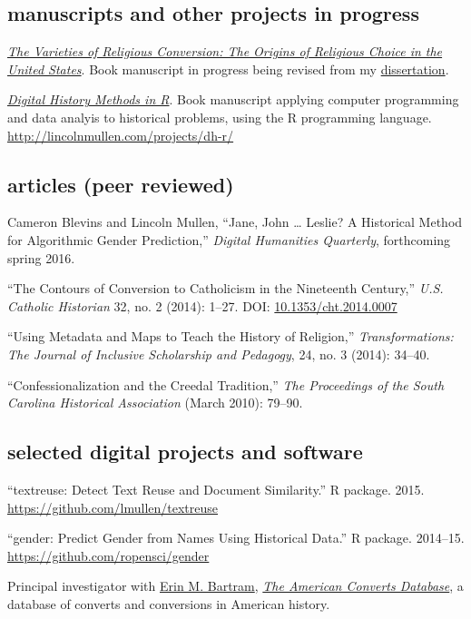\documentclass[11pt]{article}
\begin{document}
\subsection{manuscripts and other projects in
progress}\label{manuscripts-and-other-projects-in-progress}

\emph{\href{/research/\#varieties}{The Varieties of Religious
Conversion: The Origins of Religious Choice in the United States}}.
Book manuscript in progress being revised from my
\href{/research/\#dissertation}{dissertation}.

\emph{\href{http://dh-r.lincolnmullen.com/}{Digital History Methods in
R}}. Book manuscript applying computer programming and data analyis to 
historical problems, using the R programming language. 
\url{http://lincolnmullen.com/projects/dh-r/}

\subsection{articles (peer reviewed)}\label{articles-peer-reviewed}

Cameron Blevins and Lincoln Mullen, ``Jane, John \ldots{} Leslie? A
Historical Method for Algorithmic Gender Prediction,'' \emph{Digital
Humanities Quarterly}, forthcoming spring 2016.

``The Contours of Conversion to Catholicism in the Nineteenth Century,''
\emph{U.S. Catholic Historian} 32, no. 2 (2014): 1--27. DOI:
\href{http://dx.doi.org/10.1353/cht.2014.0007}{10.1353/cht.2014.0007}

``Using Metadata and Maps to Teach the History of Religion,''
\emph{Transformations: The Journal of Inclusive Scholarship and
Pedagogy}, 24, no. 3 (2014): 34--40.

``Confessionalization and the Creedal Tradition,'' \emph{The Proceedings
of the South Carolina Historical Association} (March 2010): 79--90.

\subsection{selected digital projects and software}\label{digital-projects}

``textreuse: Detect Text Reuse and Document Similarity.'' R package. 2015. 
\url{https://github.com/lmullen/textreuse}

``gender: Predict Gender from Names Using Historical Data.'' R package. 
2014--15. \url{https://github.com/ropensci/gender}

Principal investigator with
\href{http://history.uconn.edu/doctoral-students/erin-m-bartram/}{Erin
M. Bartram}, \emph{\href{http://americanconverts.org}{The American
Converts Database}}, a database of converts and conversions in American
history.
\end{document}
